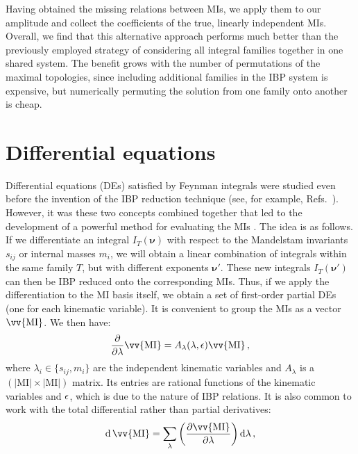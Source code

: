 \documentclass[main.tex]{subfiles}
\begin{document}
Having obtained the missing relations between MIs, we apply them to our amplitude
and collect the coefficients of the true, linearly independent MIs. Overall, we find that this alternative approach performs much better than the previously employed strategy of considering all integral families together in one shared system. The benefit grows with the number of permutations of the maximal topologies, since including additional families in the IBP system is expensive, but numerically permuting the solution from one family onto another is cheap.

\section{Differential equations} \label{sec:DEs}
Differential equations (DEs) satisfied by Feynman integrals were studied even before the invention of the IBP reduction technique (see, for example, Refs.~\cite{10.1063/1.1666327, Golubeva:1976}). However, it was these two concepts combined together that led to the development of a powerful method for evaluating the MIs \cite{Kotikov:1990kg, Kotikov:1991314, Bern:1993kr, Remiddi:1997ny, Gehrmann:1999as}. The idea is as follows. If we differentiate an integral $I_T(\bm{\nu})$ with respect to the Mandelstam invariants $s_{ij}$ or internal masses $m_i$, we will obtain a linear combination of integrals within the same family $T$, but with different exponents $\bm{\nu}'$. These new integrals $I_T(\bm{\nu}')$ can then be IBP reduced onto the corresponding MIs. Thus, if we apply the differentiation to the MI basis itself, we obtain a set of first-order partial DEs (one for each kinematic variable). It is convenient to group the MIs as a vector $\vv{\text{MI}}$. We then have:
\begin{equation} \label{eq:DEspartial}
    \frac{\partial}{\partial \lambda} \vv{\text{MI}} = A_{\lambda}(\lambda, \eps) \vv{\text{MI}}\,,
\end{equation}
where $\lambda_i \in \{s_{ij}, m_i\}$ are the independent kinematic variables and $A_\lambda$ is a $\left(|\text{MI}| \times |\text{MI}|\right)$ matrix. Its entries are rational functions of the kinematic variables and $\epsilon$, which is due to the nature of IBP relations. It is also common to work with the total differential rather than partial derivatives:
\begin{equation}
    \dd \,\vv{\text{MI}} = \sum_{\lambda} \left(\frac{\partial \vv{\text{MI}}}{\partial \lambda} \right) \dd \lambda\,,
\end{equation}
\end{document}
